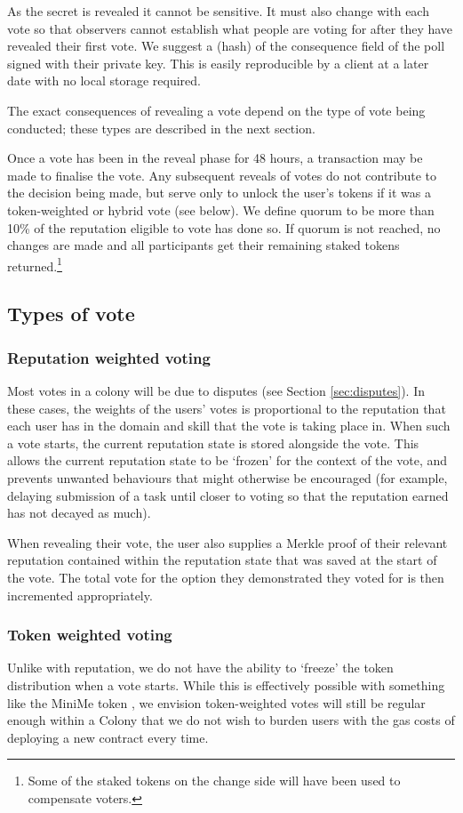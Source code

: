 As the secret is revealed it cannot be sensitive. It must also change with each vote so that observers cannot establish what people are voting for after they have revealed their first vote. We suggest a (hash) of the consequence field of the poll signed with their private key. This is easily reproducible by a client at a later date with no local storage required.

The exact consequences of revealing a vote depend on the type of vote being conducted; these types are described in the next section.

Once a vote has been in the reveal phase for 48 hours, a transaction may be made to finalise the vote. Any subsequent reveals of votes do not contribute to the decision being made, but serve only to unlock the user's tokens if it was a token-weighted or hybrid vote (see below). We define quorum to be more than 10\% of the reputation eligible to vote has done so. If quorum is not reached, no changes are made and all participants get their remaining staked tokens returned.\footnote{Some of the staked tokens on the change side will have been used to compensate voters.}


\subsection{Types of vote}
\subsubsection{Reputation weighted voting}
Most votes in a colony will be due to disputes (see Section \ref{sec:disputes}). In these cases, the weights of the users' votes is proportional to the reputation that each user has in the domain and skill that the vote is taking place in. When such a vote starts, the current reputation state is stored alongside the vote. This allows the current reputation state to be `frozen' for the context of the vote, and prevents unwanted behaviours that might otherwise be encouraged (for example, delaying submission of a task until closer to voting so that the reputation earned has not decayed as much).


When revealing their vote, the user also supplies a Merkle proof of their relevant reputation contained within the reputation state that was saved at the start of the vote. The total vote for the option they demonstrated they voted for is then incremented appropriately.

\subsubsection{Token weighted voting}
Unlike with reputation, we do not have the ability to `freeze' the token distribution when a vote starts. While this is effectively possible with something like the MiniMe token \cite{minime}, we envision token-weighted votes will still be regular enough within a Colony that we do not wish to burden users with the gas costs of deploying a new contract every time.

